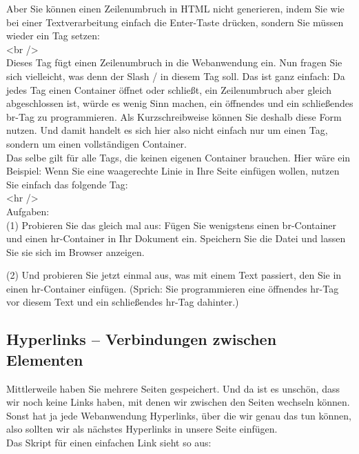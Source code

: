 Aber Sie können einen Zeilenumbruch in HTML nicht generieren, indem Sie wie bei einer Textverarbeitung einfach die Enter-Taste drücken, sondern Sie müssen wieder ein Tag setzen:\\

<br />\\

Dieses Tag fügt einen Zeilenumbruch in die Webanwendung ein. Nun fragen Sie sich vielleicht, was denn der Slash / in diesem Tag soll. Das ist ganz einfach: Da jedes Tag einen Container öffnet oder schließt, ein Zeilenumbruch aber gleich abgeschlossen ist, würde es wenig Sinn machen, ein öffnendes und ein schließendes br-Tag zu programmieren. Als Kurzschreibweise können Sie deshalb diese Form nutzen. Und damit handelt es sich hier also nicht einfach nur um einen Tag, sondern um einen vollständigen Container.\\

Das selbe gilt für alle Tags, die keinen eigenen Container brauchen. Hier wäre ein Beispiel: Wenn Sie eine waagerechte Linie in Ihre Seite einfügen wollen, nutzen Sie einfach das folgende Tag:\\

<hr />\\

Aufgaben: \\

(1)	Probieren Sie das gleich mal aus: Fügen Sie wenigstens einen br-Container und einen hr-Container in Ihr Dokument ein. Speichern Sie die Datei und lassen Sie sie sich im Browser anzeigen.

(2)	Und probieren Sie jetzt einmal aus, was mit einem Text passiert, den Sie in einen hr-Container einfügen. (Sprich: Sie programmieren eine öffnendes hr-Tag vor diesem Text und ein schließendes hr-Tag dahinter.)

\subsection{Hyperlinks – Verbindungen zwischen Elementen}

Mittlerweile haben Sie mehrere Seiten gespeichert. Und da ist es unschön, dass wir noch keine Links haben, mit denen wir zwischen den Seiten wechseln können. Sonst hat ja jede Webanwendung Hyperlinks, über die wir genau das tun können, also sollten wir als nächstes Hyperlinks in unsere Seite einfügen.\\

Das Skript für einen einfachen Link sieht so aus:\\

